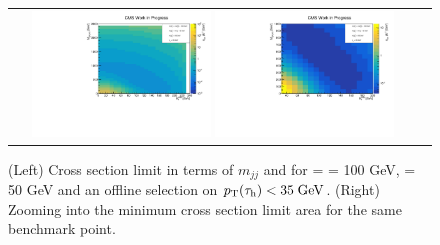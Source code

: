\begin{figure}[tbh!]
	\centering
	\begin{tabular}{cc}
		\includegraphics[width=0.45\textwidth]{analysis/pics/JetInvMass_vs_MET_xsec_chi100_lsp050_taupt35.pdf}
		\includegraphics[width=0.45\textwidth]{analysis/pics/JetInvMass_vs_MET_xsec_chi100_lsp050_taupt35_zoom.pdf} 		
	\end{tabular}
	\caption{(Left) Cross section limit in terms of $m_{jj}$ and \met for \charginopm = \neutralinotwo = 100 GeV, \neutralinoone = 50 GeV and an offline selection on $p_{\text{T}}(\tau_{\text{h}}) <  35\;\text{Ge}\kern-0.06667em\text{V}$. (Right) Zooming into the minimum cross section limit area for the same benchmark point.}
	\label{fig::JetInvMass_vs_MET_xsec_chi100_lsp050_taupt35}
\end{figure}

